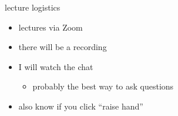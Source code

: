 \begin{frame}{lecture logistics}
    \begin{itemize}
    \item lectures via Zoom
    \item there will be a recording
    \item I will watch the chat
        \begin{itemize}
        \item probably the best way to ask questions
        \end{itemize}
    \item also know if you click ``raise hand''
    \end{itemize}
\end{frame}
